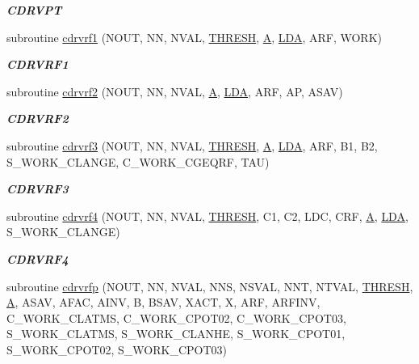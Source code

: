 \begin{DoxyCompactItemize}
\begin{DoxyCompactList}\small\item\em {\bfseries C\+D\+R\+V\+P\+T} \end{DoxyCompactList}\item 
subroutine \hyperlink{group__complex__lin_ga2ac384bccd79e1f7482d49bdfec2f00a}{cdrvrf1} (N\+O\+U\+T, N\+N, N\+V\+A\+L, \hyperlink{zlaqgs_8c_a0656018abfc9fa2821827415f5d5ea57}{T\+H\+R\+E\+S\+H}, \hyperlink{classA}{A}, \hyperlink{example__user_8c_ae946da542ce0db94dced19b2ecefd1aa}{L\+D\+A}, A\+R\+F, W\+O\+R\+K)
\begin{DoxyCompactList}\small\item\em {\bfseries C\+D\+R\+V\+R\+F1} \end{DoxyCompactList}\item 
subroutine \hyperlink{group__complex__lin_ga86d8e46945f44522b0c98bd8902651f7}{cdrvrf2} (N\+O\+U\+T, N\+N, N\+V\+A\+L, \hyperlink{classA}{A}, \hyperlink{example__user_8c_ae946da542ce0db94dced19b2ecefd1aa}{L\+D\+A}, A\+R\+F, A\+P, A\+S\+A\+V)
\begin{DoxyCompactList}\small\item\em {\bfseries C\+D\+R\+V\+R\+F2} \end{DoxyCompactList}\item 
subroutine \hyperlink{group__complex__lin_gae8155b9d7d1288944772d51748157da1}{cdrvrf3} (N\+O\+U\+T, N\+N, N\+V\+A\+L, \hyperlink{zlaqgs_8c_a0656018abfc9fa2821827415f5d5ea57}{T\+H\+R\+E\+S\+H}, \hyperlink{classA}{A}, \hyperlink{example__user_8c_ae946da542ce0db94dced19b2ecefd1aa}{L\+D\+A}, A\+R\+F, B1, B2, S\+\_\+\+W\+O\+R\+K\+\_\+\+C\+L\+A\+N\+G\+E, C\+\_\+\+W\+O\+R\+K\+\_\+\+C\+G\+E\+Q\+R\+F, T\+A\+U)
\begin{DoxyCompactList}\small\item\em {\bfseries C\+D\+R\+V\+R\+F3} \end{DoxyCompactList}\item 
subroutine \hyperlink{group__complex__lin_gaec50978389bc2aaf96c22b635ac099d7}{cdrvrf4} (N\+O\+U\+T, N\+N, N\+V\+A\+L, \hyperlink{zlaqgs_8c_a0656018abfc9fa2821827415f5d5ea57}{T\+H\+R\+E\+S\+H}, C1, C2, L\+D\+C, C\+R\+F, \hyperlink{classA}{A}, \hyperlink{example__user_8c_ae946da542ce0db94dced19b2ecefd1aa}{L\+D\+A}, S\+\_\+\+W\+O\+R\+K\+\_\+\+C\+L\+A\+N\+G\+E)
\begin{DoxyCompactList}\small\item\em {\bfseries C\+D\+R\+V\+R\+F4} \end{DoxyCompactList}\item 
subroutine \hyperlink{group__complex__lin_ga4249d3b2884c1689f4c8db5a97996f40}{cdrvrfp} (N\+O\+U\+T, N\+N, N\+V\+A\+L, N\+N\+S, N\+S\+V\+A\+L, N\+N\+T, N\+T\+V\+A\+L, \hyperlink{zlaqgs_8c_a0656018abfc9fa2821827415f5d5ea57}{T\+H\+R\+E\+S\+H}, \hyperlink{classA}{A}, A\+S\+A\+V, A\+F\+A\+C, A\+I\+N\+V, B, B\+S\+A\+V, X\+A\+C\+T, X, A\+R\+F, A\+R\+F\+I\+N\+V, C\+\_\+\+W\+O\+R\+K\+\_\+\+C\+L\+A\+T\+M\+S, C\+\_\+\+W\+O\+R\+K\+\_\+\+C\+P\+O\+T02, C\+\_\+\+W\+O\+R\+K\+\_\+\+C\+P\+O\+T03, S\+\_\+\+W\+O\+R\+K\+\_\+\+C\+L\+A\+T\+M\+S, S\+\_\+\+W\+O\+R\+K\+\_\+\+C\+L\+A\+N\+H\+E, S\+\_\+\+W\+O\+R\+K\+\_\+\+C\+P\+O\+T01, S\+\_\+\+W\+O\+R\+K\+\_\+\+C\+P\+O\+T02, S\+\_\+\+W\+O\+R\+K\+\_\+\+C\+P\+O\+T03)

\end{DoxyCompactItemize}
